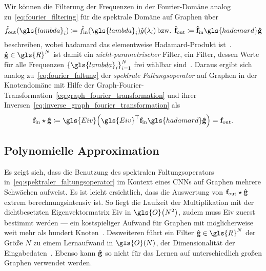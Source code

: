 Wir können die Filterung der Frequenzen in der Fourier-Domäne analog zu~\eqref{eq:fourier_filtering} für die spektrale Domäne auf Graphen über
\begin{equation*}
  \hat f_{\mathrm{out}}\left(\gls{lambda}_i\right) \coloneqq \hat f_{\mathrm{in}}\left(\gls{lambda}_i\right)\hat g\left(\lambda_i\right)\,\text{\bzw{} }\ve{\hat f}_{\mathrm{out}} \coloneqq \ve{\hat f}_{\mathrm{in}} \gls{hadamard} \ve{\hat g}
\end{equation*}
beschreiben, wobei \gls{hadamard} das elementweise Hadamard-Produkt ist~\cite{Shuman}.
$\ve{\hat g} \in \gls{R}^N$ ist damit ein \emph{nicht-parametrischer} Filter, \dhe{} ein Filter, dessen Werte für alle Frequenzen ${\left\{\gls{lambda}_i\right\}}_{i=1}^N$ frei wählbar sind~\cite{Defferrard}.
Daraus ergibt sich analog zu~\eqref{eq:fourier_faltung} der \emph{spektrale Faltungsoperator} auf Graphen in der Knotendomäne mit Hilfe der Graph-Fourier-Transformation~\eqref{eq:graph_fourier_transformation} und ihrer Inversen~\eqref{eq:inverse_graph_fourier_transformation} als~\cite{Shuman, Defferrard}
\begin{equation}
  \ve{f}_{\mathrm{in}} \star \ve{\hat g} \coloneqq \gls{Eiv}\left(\gls{Eiv}^{\top}\ve{f}_{\mathrm{in}} \gls{hadamard} \ve{\hat g}\right) = \ve{f}_{\mathrm{out}}.
  \label{eq:spektraler_faltungsoperator}
\end{equation}

\subsection{Polynomielle Approximation}
\label{polynomielle_approximation}

Es zeigt sich, dass die Benutzung des spektralen Faltungsoperators in~\eqref{eq:spektraler_faltungsoperator} im Kontext eines \glspl{CNN} auf Graphen mehrere Schwächen aufweist.
Es ist \zB{} leicht ersichtlich, dass die Auswertung von $\mathbf{f}_{\mathrm{out}} \star \mathbf{\hat g}$ extrem berechnungsintensiv ist.
So liegt die Laufzeit der Multiplikation mit der dichtbesetzten Eigenvektormatrix \gls{Eiv} in $\gls{O}\left(N^2\right)$, zudem muss \gls{Eiv} zuerst bestimmt werden — ein kostspieliger Aufwand für Graphen mit möglicherweise weit mehr als hundert Knoten~\cite{gcn}.
Desweiteren führt ein Filter $\ve{\hat g} \in \gls{R}^N$ der Größe $N$ zu einem Lernaufwand in $\gls{O}\left(N\right)$, \dhe{} der Dimensionalität der Eingabedaten~\cite{Defferrard}.
Ebenso kann $\mathbf{\hat g}$ so nicht für das Lernen auf unterschiedlich großen Graphen verwendet werden.

